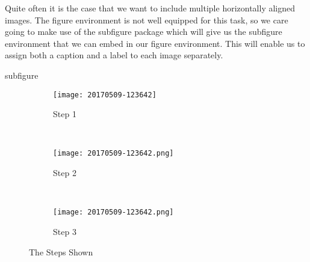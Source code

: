 Quite often it is the case that we want to include multiple horizontally
aligned images.  The figure environment is not well equipped for this task, so
we care going to make use of the subfigure package which will give us the 
subfigure environment that we can embed in our figure environment.  This will
enable us to assign both a caption and a label to each image separately.
\begin{docEnvironment}[doclang/environment content=image content goes here]{subfigure}{}{}
\begin{dispListing}
\begin{figure}
    \begin{center}
    \begin{subfigure}[b]{0.3\textwidth}
        \texttt{[image: 20170509-123642]}
        \caption{Step 1}
        \label{fig:step1a}
    \end{subfigure}
    ~   %
    \begin{subfigure}[b]{0.3\textwidth}
        \texttt{[image: 20170509-123642.png]}
        \caption{Step 2}
        \label{fig:step2a}
    \end{subfigure}
    ~   %
    \begin{subfigure}[b]{0.3\textwidth}
        \texttt{[image: 20170509-123642.png]}
        \caption{Step 3}
        \label{fig:step3a}
    \end{subfigure}
    \caption{The Steps Shown}\label{fig:threestepsa}
    \end{center}
\end{figure}
\end{dispListing}
\end{docEnvironment}
